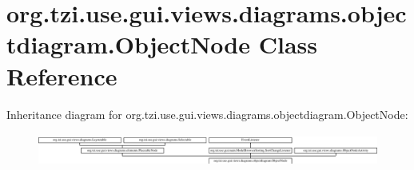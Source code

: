 \hypertarget{classorg_1_1tzi_1_1use_1_1gui_1_1views_1_1diagrams_1_1objectdiagram_1_1_object_node}{\section{org.\-tzi.\-use.\-gui.\-views.\-diagrams.\-objectdiagram.\-Object\-Node Class Reference}
\label{classorg_1_1tzi_1_1use_1_1gui_1_1views_1_1diagrams_1_1objectdiagram_1_1_object_node}
}
Inheritance diagram for org.\-tzi.\-use.\-gui.\-views.\-diagrams.\-objectdiagram.\-Object\-Node\-:\begin{figure}[H]
\begin{center}
\leavevmode
\includegraphics[height=1.129032cm]{classorg_1_1tzi_1_1use_1_1gui_1_1views_1_1diagrams_1_1objectdiagram_1_1_object_node}
\end{center}
\end{figure}
